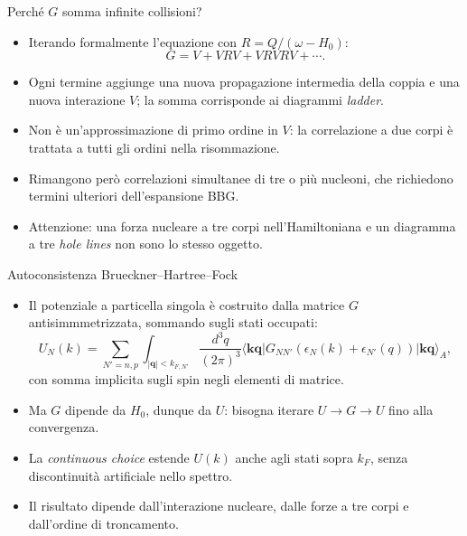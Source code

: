 \begin{frame}[t]{Perché $G$ somma infinite collisioni?}
\small
\begin{itemize}
\item Iterando formalmente l'equazione con $R=Q/(\omega-H_0)$:
\[
G=V+VRV+VRVRV+\cdots.
\]
\item Ogni termine aggiunge una nuova propagazione intermedia della coppia e una nuova interazione $V$; la somma corrisponde ai diagrammi \emph{ladder}.
\item Non è un'approssimazione di primo ordine in $V$: la correlazione a due corpi è trattata a tutti gli ordini nella risommazione.
\item Rimangono però correlazioni simultanee di tre o più nucleoni, che richiedono termini ulteriori dell'espansione BBG.
\item Attenzione: una forza nucleare a tre corpi nell'Hamiltoniana e un diagramma a tre \emph{hole lines} non sono lo stesso oggetto.
\end{itemize}
\end{frame}

\begin{frame}[t]{Autoconsistenza Brueckner--Hartree--Fock}
\small
\begin{itemize}
\item Il potenziale a particella singola è costruito dalla matrice $G$ antisimmmetrizzata, sommando sugli stati occupati:
\[
U_N(k)=\sum_{N'=n,p}\int_{|\mathbf q|<k_{F,N'}}\!\frac{d^3q}{(2\pi)^3}
\langle \mathbf k\mathbf q|G_{NN'}(\epsilon_N(k)+\epsilon_{N'}(q))|\mathbf k\mathbf q\rangle_A,
\]
con somma implicita sugli spin negli elementi di matrice.
\item Ma $G$ dipende da $H_0$, dunque da $U$: bisogna iterare $U\to G\to U$ fino alla convergenza.
\item La \emph{continuous choice} estende $U(k)$ anche agli stati sopra $k_F$, senza discontinuità artificiale nello spettro.
\item Il risultato dipende dall'interazione nucleare, dalle forze a tre corpi e dall'ordine di troncamento.
\end{itemize}
\end{frame}

